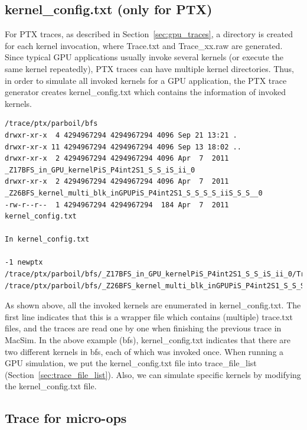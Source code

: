 \subsection{kernel\_config.txt (only for PTX)}

For PTX traces, as described in Section~\ref{sec:gpu_traces}, a directory is
created for each kernel invocation, where Trace.txt and Trace\_xx.raw are
generated. Since typical GPU applications usually invoke several kernels (or
    execute the same kernel repeatedly), PTX traces can have multiple kernel
directories. Thus, in order to simulate all invoked kernels for a GPU
application, the PTX trace generator creates kernel\_config.txt which contains
the information of invoked kernels.


\begin{Verbatim}
/trace/ptx/parboil/bfs
drwxr-xr-x  4 4294967294 4294967294 4096 Sep 21 13:21 .
drwxr-xr-x 11 4294967294 4294967294 4096 Sep 13 18:02 ..
drwxr-xr-x  2 4294967294 4294967294 4096 Apr  7  2011 _Z17BFS_in_GPU_kernelPiS_P4int2S1_S_S_iS_ii_0
drwxr-xr-x  2 4294967294 4294967294 4096 Apr  7  2011 _Z26BFS_kernel_multi_blk_inGPUPiS_P4int2S1_S_S_S_S_iiS_S_S__0
-rw-r--r--  1 4294967294 4294967294  184 Apr  7  2011 kernel_config.txt

In kernel_config.txt

-1 newptx
/trace/ptx/parboil/bfs/_Z17BFS_in_GPU_kernelPiS_P4int2S1_S_S_iS_ii_0/Trace.txt
/trace/ptx/parboil/bfs/_Z26BFS_kernel_multi_blk_inGPUPiS_P4int2S1_S_S_S_S_iiS_S_S__0/Trace.txt
\end{Verbatim}


As shown above, all the invoked kernels are enumerated in kernel\_config.txt.
The first line indicates that this is a wrapper file which contains (multiple) trace.txt files, and
the traces are read one by one when finishing the previous trace in MacSim.
In the above example (bfs), kernel\_config.txt indicates that there are two different
kernels in bfs, each of which was invoked once. When running a GPU simulation, we put 
the kernel\_config.txt file into trace\_file\_list (Section~\ref{sec:trace_file_list}). 
Also, we can simulate specific kernels by modifying the kernel\_config.txt file.

\subsection{Trace for micro-ops}

